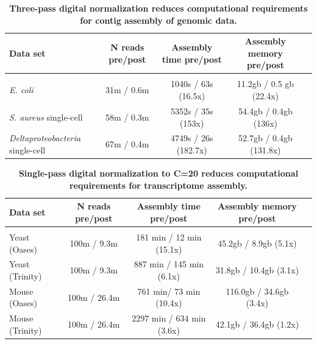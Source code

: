 \documentclass{pnastwo}
\begin{document}

\begin{table}[!ht]
\caption{
\bf{Three-pass digital normalization reduces computational requirements for contig assembly of genomic data.}}
\begin{tabular}{|l|c|c|c|c|}

Data set & N reads pre/post & Assembly time pre/post & Assembly memory pre/post \\
\hline \\
{\em E. coli} & 31m / 0.6m & 1040s / 63s (16.5x) & 11.2gb / 0.5 gb (22.4x) \\ 
{\em S. aureus} single-cell & 58m / 0.3m & 5352s / 35s (153x) & 54.4gb / 0.4gb (136x) \\
{\em Deltaproteobacteria} single-cell & 67m / 0.4m & 4749s / 26s (182.7x) & 52.7gb / 0.4gb (131.8x) \\

\end{tabular}
\begin{flushleft}
\end{flushleft}
\label{tab:dngenome}
\end{table}




\begin{table}[!ht]
\caption{
\bf{Single-pass digital normalization to C=20 reduces computational
requirements for transcriptome assembly.}}


\begin{tabular}{|l|c|c|c|c|}

Data set & N reads pre/post & Assembly time pre/post & Assembly memory pre/post \\
 \hline \\
Yeast (Oases) & 100m / 9.3m & 181 min / 12 min (15.1x) & 45.2gb / 8.9gb (5.1x) \\
Yeast (Trinity) & 100m / 9.3m & 887 min / 145 min (6.1x) & 31.8gb / 10.4gb (3.1x) \\
Mouse (Oases) & 100m / 26.4m & 761 min/ 73 min (10.4x) & 116.0gb / 34.6gb (3.4x) \\
Mouse (Trinity) & 100m / 26.4m & 2297 min / 634 min (3.6x) & 42.1gb / 36.4gb (1.2x) \\
\end{tabular}

\begin{flushleft}
\end{flushleft}
\label{tab:dntrans}
\end{table}
\end{document}
